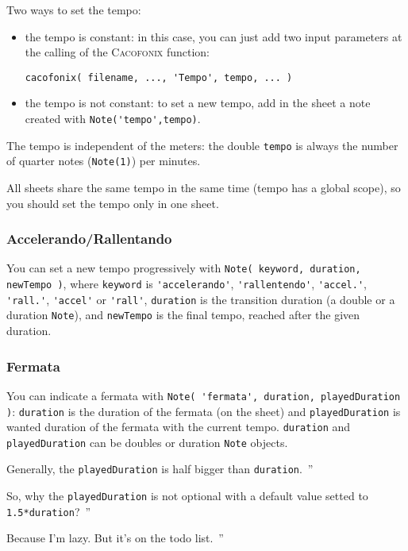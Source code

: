 \documentclass{article}
\newcommand{\cacofonix}{\textsc{Cacofonix}\xspace}
\newcommand{\note}{\lstinline!Note!\xspace}
\newenvironment{meenv}{ \par \noindent \makebox[6em][r]{ \textcolor{mecolor}{Me}: `` --~}}{~''}
\newenvironment{myselfenv}{ \par \noindent \makebox[6em][r]{ \textcolor{myselfcolor}{Myself}: `` --~}}{~''}
\newcommand{\me}[1]{\begin{meenv}#1\end{meenv}}
\newcommand{\myself}[1]{\begin{myselfenv}#1\end{myselfenv}}
\begin{document}
Two ways to set the tempo:
\begin{itemize}
	\item the tempo is constant: in this case, you can just add two input parameters at the calling of the \cacofonix function:
\begin{lstlisting}
cacofonix( filename, ..., 'Tempo', tempo, ... )
\end{lstlisting}
	\item the tempo is not constant: to set a new tempo, add in the sheet a note created with \lstinline!Note('tempo',tempo)!.
\end{itemize}

The tempo is independent of the meters: the double \lstinline!tempo! is always the number of quarter notes (\lstinline!Note(1)!) per minutes.

All sheets share the same tempo in the same time (tempo has a global scope), so you should set the tempo only in one sheet.

\subsubsection{Accelerando/Rallentando}
\label{sec:AccelerandoRallentando}

You can set a new tempo progressively with \lstinline!Note( keyword, duration, newTempo )!, where \lstinline!keyword! is \lstinline!'accelerando'!, \lstinline!'rallentendo'!, \lstinline!'accel.'!, \lstinline!'rall.'!, \lstinline!'accel'! or \lstinline!'rall'!, \lstinline!duration! is the transition duration (a double or a duration \note), and \lstinline!newTempo! is the final tempo, reached after the given duration.

\subsubsection{Fermata}
\label{sec:Fermata}

You can indicate a fermata with \lstinline!Note( 'fermata', duration, playedDuration )!: \lstinline!duration! is the duration of the fermata (on the sheet) and \lstinline!playedDuration! is wanted duration of the fermata with the current tempo. \lstinline!duration! and \lstinline!playedDuration! can be doubles or duration \note objects.

\myself{Generally, the \lstinline!playedDuration! is half bigger than \lstinline!duration!.}
\me{So, why the \lstinline!playedDuration! is not optional with a default value setted to \lstinline!1.5*duration!?}
\myself{Because I'm lazy. But it's on the todo list.}
\end{document}
